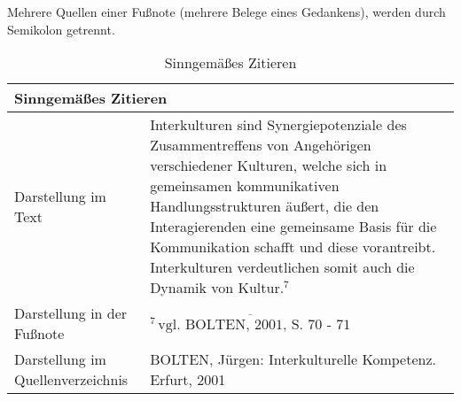 Mehrere Quellen einer Fußnote (mehrere Belege eines Gedankens), werden durch Semikolon getrennt.
\begin{table}[H]
    \begin{tabularx}{\columnwidth}{|p{4cm}|X|}
        \hline
        \multicolumn{2}{|l|}{\textbf{Sinngemäßes Zitieren}}\\
        \hline\small
        Darstellung im Text & \normalsize Interkulturen sind Synergiepotenziale des Zusammentreffens von Angehörigen verschiedener Kulturen, welche sich in gemeinsamen kommunikativen Handlungsstrukturen äußert, die den Interagierenden eine gemeinsame Basis für die Kommunikation schafft und diese vorantreibt. Interkulturen verdeutlichen somit auch die Dynamik von Kultur.$^7$\\
        \hline\small
        Darstellung in der Fußnote & \vspace{.05pt}\normalsize$\overline{^7\,\text{vgl. BOLTEN, 2001, S. 70 - 71}}$\\
        \hline\small
        Darstellung im Quellenverzeichnis & \normalsize BOLTEN, Jürgen: Interkulturelle Kompetenz. Erfurt, 2001\\
        \hline
    \end{tabularx}
    \caption{Sinngemäßes Zitieren}
    \label{tab-sinngem-zitieren}
\end{table}

